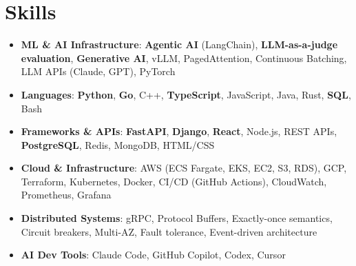 \documentclass[letterpaper,11pt]{article}
\newcommand{\resumeSubHeadingListStart}{\begin{itemize}[leftmargin=0.15in, label={}]}
\newcommand{\resumeSubHeadingListEnd}{\end{itemize}}
\newcommand{\resumeSkillHeading}[2]{%
  \item\small{\textbf{#1}: #2 \vspace{-9pt}}%
}
\begin{document}
\section{Skills}
  \resumeSubHeadingListStart
    \resumeSkillHeading{ML \& AI Infrastructure}{\textbf{Agentic AI} (LangChain), \textbf{LLM-as-a-judge evaluation}, \textbf{Generative AI}, vLLM, PagedAttention, Continuous Batching, LLM APIs (Claude, GPT), PyTorch}
    \resumeSkillHeading{Languages}{\textbf{Python}, \textbf{Go}, C++, \textbf{TypeScript}, JavaScript, Java, Rust, \textbf{SQL}, Bash}
    \resumeSkillHeading{Frameworks \& APIs}{\textbf{FastAPI}, \textbf{Django}, \textbf{React}, Node.js, REST APIs, \textbf{PostgreSQL}, Redis, MongoDB, HTML/CSS}
    \resumeSkillHeading{Cloud \& Infrastructure}{AWS (ECS Fargate, EKS, EC2, S3, RDS), GCP, Terraform, Kubernetes, Docker, CI/CD (GitHub Actions), CloudWatch, Prometheus, Grafana}
    \resumeSkillHeading{Distributed Systems}{gRPC, Protocol Buffers, Exactly-once semantics, Circuit breakers, Multi-AZ, Fault tolerance, Event-driven architecture}
    \resumeSkillHeading{AI Dev Tools}{Claude Code, GitHub Copilot, Codex, Cursor}
  \resumeSubHeadingListEnd
\end{document}
